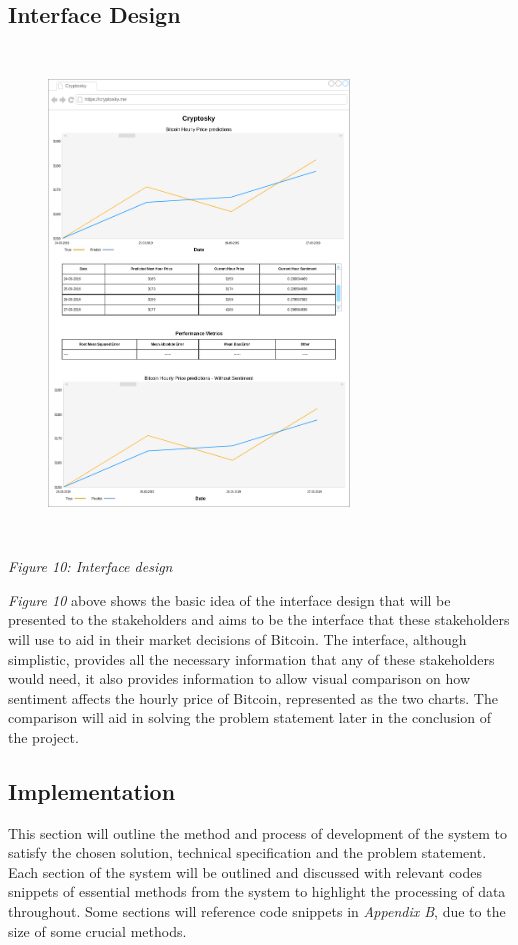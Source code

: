 \documentclass[oneside, 12pt]{article}
\begin{document}
		\subsection{Interface Design}
		
		
		\begin{figure}[hbt!]
			\centering
			\includegraphics[width=8cm,height=13cm]{images/interface_design.png}
		\end{figure}
		\begin{center}
			\textit{Figure 10: Interface design}
		\end{center}
		\textit{Figure 10} above shows the basic idea of the interface design that will be presented to the stakeholders and aims to be the interface that these stakeholders will use to aid in their market decisions of Bitcoin. The interface, although simplistic, provides all the necessary information that any of these stakeholders would need, it also provides information to allow visual comparison on how sentiment affects the hourly price of Bitcoin, represented as the two charts. The comparison will aid in solving the problem statement later in the conclusion of the project.
		
	\newpage 
	\begin{center}
		\section{Implementation}\label{implementation}
	\end{center}
		This section will outline the method and process of development of the system to satisfy the chosen solution, technical specification and the problem statement. Each section of the system will be outlined and discussed with relevant codes snippets of essential methods from the system to highlight the processing of data throughout. Some sections will reference code snippets in \textit{Appendix B}, due to the size of some crucial methods.
		\newline
		
\end{document}
